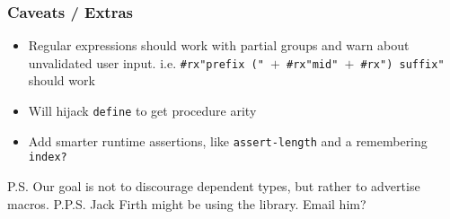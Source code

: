 \documentclass{article}
\begin{document}
\subsubsection*{Caveats / Extras}
\begin{itemize}
  \item Regular expressions should work with partial groups and warn about unvalidated user input.
  \subitem  i.e. \texttt{\#rx"prefix (" $+$ \#rx"mid" $+$ \#rx") suffix"} should work
  \item {Will hijack \texttt{define} to get procedure arity}
  \item {Add smarter runtime assertions, like \texttt{assert-length} and a remembering \texttt{index?}}
\end{itemize}

P.S. Our goal is not to discourage dependent types, but rather to advertise macros.
P.P.S. Jack Firth might be using the library. Email him?
\end{document}
